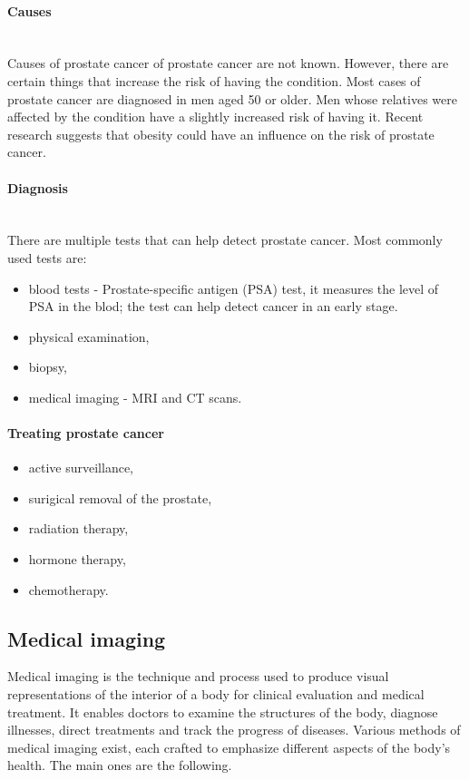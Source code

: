 \paragraph{Causes\cite{nhs_choices_2024}}\mbox{} \\
\indent Causes of prostate cancer of prostate cancer are not known. However, there are certain things that increase the risk of having the condition. 
Most cases of prostate cancer are diagnosed in men aged 50 or older. 
Men whose relatives were affected by the condition have a slightly increased risk of having it. Recent research suggests that obesity could have an influence on the risk of prostate cancer.

\paragraph{Diagnosis\cite{nhs_choices_2024}}\mbox{} \\
There are multiple tests that can help detect prostate cancer. 
Most commonly used tests are\cite{nhs_choices_2024}:
\begin{itemize}
    \item blood tests - Prostate-specific antigen (PSA) test, it measures the level of PSA in the blod; the test can help detect cancer in an early stage.
    \item physical examination,
    \item biopsy,
    \item medical imaging - MRI and CT scans.
\end{itemize}

\paragraph{Treating prostate cancer\cite{nhs_choices_2024}}
\begin{itemize}
    \item active surveillance,
    \item surigical removal of the prostate,
    \item radiation therapy,
    \item hormone therapy,
    \item chemotherapy.
    
\end{itemize}

\subsection{Medical imaging}
Medical imaging is the technique and process used to produce visual representations of the interior of a body for clinical evaluation and medical treatment. It enables doctors to examine the structures of the body, diagnose illnesses, direct treatments and track the progress of diseases. Various methods of medical imaging exist, each crafted to emphasize different aspects of the body's health. The main ones are the following.

